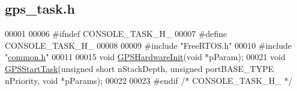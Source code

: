 \hypertarget{gps__task_8h_source}{\subsection{gps\+\_\+task.\+h}
\label{gps__task_8h_source}
}

\begin{DoxyCode}
00001 
00006 \textcolor{preprocessor}{#ifndef CONSOLE\_TASK\_H\_}
00007 \textcolor{preprocessor}{#define CONSOLE\_TASK\_H\_}
00008 
00009 \textcolor{preprocessor}{#include "FreeRTOS.h"}
00010 \textcolor{preprocessor}{#include "\hyperlink{common_8h}{common.h}"}
00011 
00015 \textcolor{keywordtype}{void} \hyperlink{gps__task_8h_ab5a1e3a14590de2541497dd0c38c15a8}{GPSHardwareInit}(\textcolor{keywordtype}{void} *pParam);
00021 \textcolor{keywordtype}{void} \hyperlink{gps__task_8h_ac8c08e783e9eabb617e98e4af988aeed}{GPSStartTask}(\textcolor{keywordtype}{unsigned} \textcolor{keywordtype}{short} nStackDepth, \textcolor{keywordtype}{unsigned} portBASE\_TYPE nPriority, \textcolor{keywordtype}{void} *pParams);
00022 
00023 \textcolor{preprocessor}{#endif }\textcolor{comment}{/* CONSOLE\_TASK\_H\_ */}\textcolor{preprocessor}{}
\end{DoxyCode}
